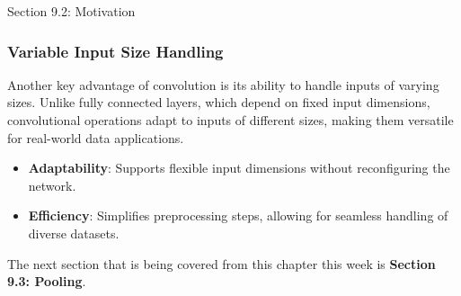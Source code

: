 \begin{notes}{Section 9.2: Motivation}
    \subsubsection*{Variable Input Size Handling}
    
    Another key advantage of convolution is its ability to handle inputs of varying sizes. Unlike fully connected layers, which depend on fixed input dimensions, convolutional operations adapt to inputs 
    of different sizes, making them versatile for real-world data applications.
    
    \begin{highlight}
        \begin{itemize}
            \item \textbf{Adaptability}: Supports flexible input dimensions without reconfiguring the network.
            \item \textbf{Efficiency}: Simplifies preprocessing steps, allowing for seamless handling of diverse datasets.
        \end{itemize}
    \end{highlight}
\end{notes}

The next section that is being covered from this chapter this week is \textbf{Section 9.3: Pooling}.

